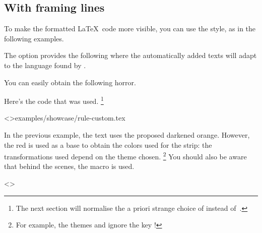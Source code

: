 \documentclass{tutodoc}
\begin{document}
\subsection{With framing lines}

To make the formatted \LaTeX\ code more visible, you can use the  style, as in the following examples.


\begin{tdocexa}
	The  option provides the following where the automatically added texts will adapt to the language found by \thisproj.

	
\end{tdocexa}


\begin{tdocexa}
	You can easily obtain the following horror.

	

	Here's the code that was used.%
	\footnote{
		The next section will normalise the a priori strange choice of  instead of \,.
	}

	\tdoclatexinput<>{examples/showcase/rule-custom.tex}
\end{tdocexa}


\begin{tdocnote}
    In the previous example, the text uses the proposed darkened orange. However, the red is used as a base to obtain the colors used for the strip: the transformations used depend on the theme chosen.%
    \footnote{
        For example, the themes  and  ignore the key !
    }
    You should also be aware that behind the scenes, the macro  is used.

    \begin{tdoclatex}<>
    \end{tdoclatex}
\end{tdocnote}
\end{document}
